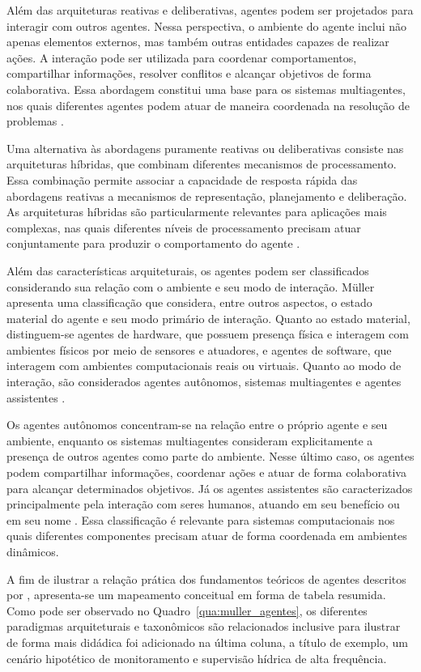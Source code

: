 Além das arquiteturas reativas e deliberativas, agentes podem ser projetados
para interagir com outros agentes. Nessa perspectiva, o ambiente do agente
inclui não apenas elementos externos, mas também outras entidades capazes de
realizar ações. A interação pode ser utilizada para coordenar comportamentos,
compartilhar informações, resolver conflitos e alcançar objetivos de forma
colaborativa. Essa abordagem constitui uma base para os sistemas
multiagentes, nos quais diferentes agentes podem atuar de maneira coordenada
na resolução de problemas \cite{muller1999}.

Uma alternativa às abordagens puramente reativas ou deliberativas consiste
nas arquiteturas híbridas, que combinam diferentes mecanismos de
processamento. Essa combinação permite associar a capacidade de resposta
rápida das abordagens reativas a mecanismos de representação, planejamento e
deliberação. As arquiteturas híbridas são particularmente relevantes para
aplicações mais complexas, nas quais diferentes níveis de processamento
precisam atuar conjuntamente para produzir o comportamento do agente
\cite{muller1999}.

Além das características arquiteturais, os agentes podem ser classificados
considerando sua relação com o ambiente e seu modo de interação. Müller
\cite{muller1999} apresenta uma classificação que considera, entre outros
aspectos, o estado material do agente e seu modo primário de interação.
Quanto ao estado material, distinguem-se agentes de hardware, que possuem
presença física e interagem com ambientes físicos por meio de sensores e
atuadores, e agentes de software, que interagem com ambientes computacionais
reais ou virtuais. Quanto ao modo de interação, são considerados agentes
autônomos, sistemas multiagentes e agentes assistentes
\cite{muller1999}.

Os agentes autônomos concentram-se na relação entre o próprio agente e seu ambiente, enquanto os sistemas multiagentes consideram explicitamente a presença de outros agentes como parte do ambiente. Nesse último caso, os agentes podem compartilhar informações, coordenar ações e atuar de forma colaborativa para alcançar determinados objetivos. Já os agentes assistentes são caracterizados principalmente pela interação com seres humanos, atuando em seu benefício ou em seu nome \cite{muller1999}. Essa classificação é relevante para sistemas computacionais nos quais diferentes componentes precisam atuar de forma coordenada em ambientes dinâmicos.

A fim de ilustrar a relação prática dos fundamentos teóricos de agentes descritos por , apresenta-se um
mapeamento conceitual em forma de tabela resumida. Como pode ser observado no Quadro~\ref{qua:muller_agentes}, os diferentes
paradigmas arquiteturais e taxonômicos são relacionados inclusive para ilustrar de forma mais didádica foi adicionado na última coluna, a título de exemplo, um cenário hipotético de monitoramento e supervisão hídrica de alta frequência.

